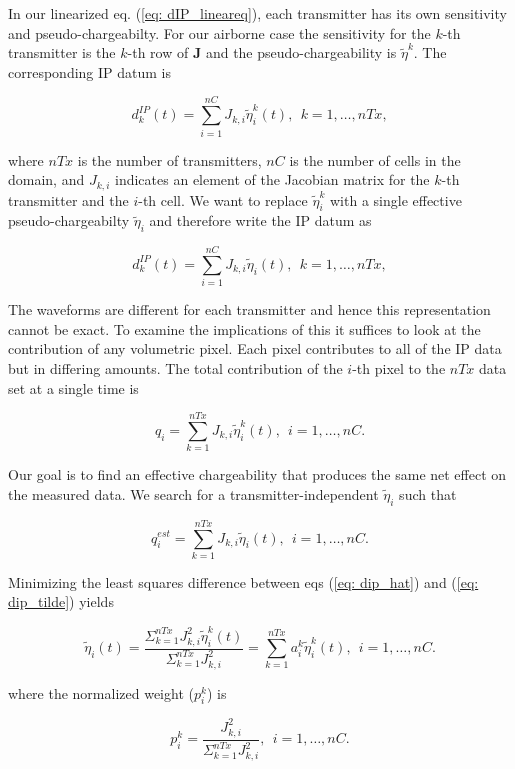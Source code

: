 \documentclass[extra,mreferee]{gji}
\newcommand{\peta}{\tilde{\eta}}
\newcommand{\dip}{d^{IP}}
\begin{document}
In our linearized eq. (\ref{eq: dIP_lineareq}), each transmitter has its own sensitivity and pseudo-chargeabilty. For our airborne case the sensitivity for the $k$-th transmitter is the $k$-th row of $\mathbf{J}$ and the pseudo-chargeability is $\peta^k$. The corresponding  IP datum is 
\begin{linenomath*}
\begin{equation}
  \dip_k(t) = \sum_{i=1}^{nC}J_{k,i}\peta^k_i (t), \ \ k=1, \ldots, nTx,
  \label{eq: dip_kthTx}
\end{equation}
\end{linenomath*}
where $nTx$ is the number of transmitters, $nC$ is the number of cells in the domain, and $J_{k,i}$ indicates an element of the Jacobian matrix for the $k$-th transmitter and the $i$-th cell. We want to replace $\peta^k_i$ with a single effective pseudo-chargeabilty $\peta_i$ and therefore write the IP datum as 
\begin{linenomath*}
\begin{equation}
  \dip_k(t) = \sum_{i=1}^{nC}J_{k,i}\peta_i (t), \ \ k=1, \ldots, nTx,
  \label{eq: dipeff_kthTx}
\end{equation}
\end{linenomath*}
The waveforms are different for each transmitter and hence this representation cannot be exact. To examine the implications of this it suffices to look at the contribution of any volumetric pixel. Each pixel contributes to all of the IP data but in differing amounts. The total contribution of the  $i$-th pixel to the $nTx$ data set at a single time is  
\begin{linenomath*}
\begin{equation}
  q_i =\sum_{k=1}^{nTx} J_{k,i} \peta^k_i(t), \ \ i=1, \ldots, nC.
  \label{eq: dip_hat}
\end{equation}
\end{linenomath*}
Our goal is to find an effective chargeability that produces the same net effect on the measured data. We search for a transmitter-independent $\peta_i$ such that 
\begin{linenomath*}
\begin{equation}
  q_i^{est} =\sum_{k=1}^{nTx} J_{k,i} \peta_i(t), \ \ i=1, \ldots, nC.
  \label{eq: dip_tilde}
\end{equation}
\end{linenomath*}
Minimizing the least squares difference between eqs (\ref{eq: dip_hat}) and (\ref{eq: dip_tilde}) yields
\begin{linenomath*}
\begin{equation}
  \peta_i(t) = \frac {\Sigma_{k=1}^{nTx} J_{k,i}^2\peta^k_i(t)} {\Sigma_{k=1}^{nTx} J_{k,i}^2} = \sum_{k=1}^{nTx} a^k_i \peta^k_i(t), \ \ i=1, \ldots, nC.
  \label{eq: petaeff}
\end{equation}
\end{linenomath*}
where the normalized weight ($p^k_i$) is 
\begin{linenomath*}
\begin{equation}
  p^k_i = \frac {J^2_{k,i}} {\Sigma_{k=1}^{nTx} J^2_{k,i}}, \ \ i=1, \ldots, nC.
  \label{eq: normalized_weights}
\end{equation}
\end{linenomath*}
\end{document}
